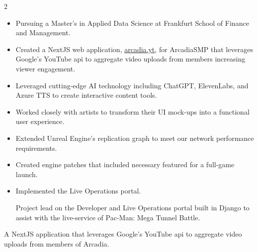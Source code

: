 \documentclass[10pt,a4paper,ragged2e,withhyper]{altacv}
\begin{document}
\begin{paracol}{2}
\begin{itemize}
  \item Pursuing a Master's in Applied Data Science at Frankfurt School of Finance and Management.
\end{itemize}

\divider{}

\begin{itemize}
  \item Created a NextJS web application, \href{https://arcadia.yt}{arcadia.yt}, for ArcadiaSMP that leverages Google's YouTube api to aggregate video uploads from members increasing viewer engagement.
  \item Leveraged cutting-edge AI technology including ChatGPT, ElevenLabs, and Azure TTS to create interactive content tools.
\end{itemize}

\divider{}

\begin{itemize}
  \item Worked closely with artists to transform their UI mock-ups into a functional user experience.
  \item Extended Unreal Engine's replication graph to meet our network performance requirements.
  \item Created engine patches that included necessary featured for a full-game launch.
  \item Implemented the Live Operations portal.
  
  Project lead on the Developer and Live Operations portal built in Django to assist with the live-service of Pac-Man: Mega Tunnel Battle.
\end{itemize}

A NextJS application that leverages Google's YouTube api to aggregate video uploads from members of Arcadia.


\end{paracol}
\end{document}
